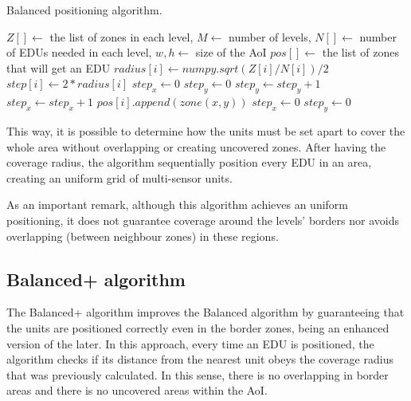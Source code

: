 \begin{refsection}
\begin{algorithm}[ht!]
    \caption{Balanced positioning algorithm.}
    \label{alg:balanced}
    \begin{algorithmic}
        \REQUIRE $Z[] \gets$ the list of zones in each level, $M \gets$ number of levels, $N[] \gets$ number of EDUs needed in each level, $w, h \gets$ size of the AoI
        \ENSURE $pos[] \gets$ the list of zones that will get an EDU
            \STATE $radius[i] \gets numpy.sqrt(Z[i] / N[i]) / 2$
            \STATE $step[i] \gets 2 * radius[i]$
        \ENDFOR
        \STATE $step_x \gets 0$
        \STATE $step_y \gets 0$
            \STATE $step_y \gets step_y + 1$
                \STATE $step_x \gets step_x + 1$
                        \STATE $pos[i].append(zone(x, y))$
                        \STATE $step_x \gets 0$
                        \STATE $step_y \gets 0$
                    \ENDIF
                \ENDFOR
            \ENDFOR
        \ENDFOR
    \end{algorithmic}
\end{algorithm}

This way, it is possible to determine how the units must be set apart to cover the whole area without overlapping or creating uncovered zones. After having the coverage radius, the algorithm sequentially position every EDU in an area, creating an uniform grid of multi-sensor units.

As an important remark, although this algorithm achieves an uniform positioning, it does not guarantee coverage around the levels' borders nor avoids overlapping (between neighbour zones) in these regions.

\subsection {Balanced+ algorithm}

The Balanced+ algorithm improves the Balanced algorithm by guaranteeing that the units are positioned correctly even in the border zones, being an enhanced version of the later. In this approach, every time an EDU is positioned, the algorithm checks if its distance from the nearest unit obeys the coverage radius that was previously calculated. In this sense, there is no overlapping in border areas and there is no uncovered areas within the AoI.


\end{refsection}
